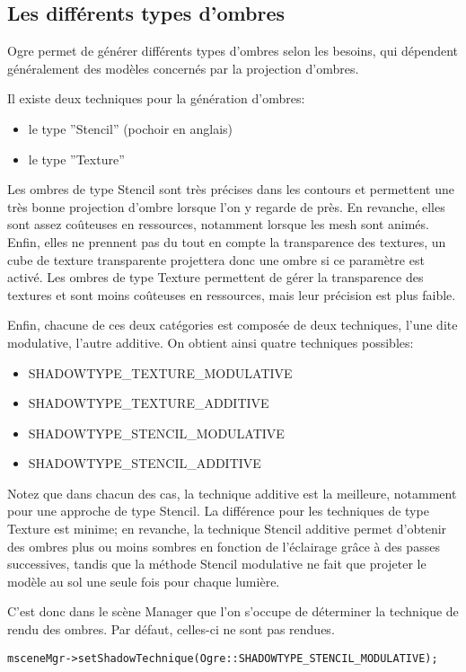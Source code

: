 \subsection{Les diff\'erents types d'ombres}

Ogre permet de g\'en\'erer diff\'erents types d'ombres selon les besoins, qui d\'ependent g\'en\'eralement des mod\`eles concern\'es par la projection d'ombres.

Il existe deux techniques pour la g\'en\'eration d'ombres:
\begin{itemize}
\item le type ''Stencil'' (pochoir en anglais)
\item le type ''Texture''
\end{itemize}

Les ombres de type Stencil sont tr\`es pr\'ecises dans les contours et permettent une tr\`es bonne projection d'ombre lorsque l'on y regarde de pr\`es. En revanche, elles sont assez co\^uteuses en ressources, notamment lorsque les mesh sont anim\'es. Enfin, elles ne prennent pas du tout en compte la transparence des textures, un cube de texture transparente projettera donc une ombre si ce param\`etre est activ\'e.
Les ombres de type Texture permettent de g\'erer la transparence des textures et sont moins co\^uteuses en ressources, mais leur pr\'ecision est plus faible.

Enfin, chacune de ces deux cat\'egories est compos\'ee de deux techniques, l'une dite modulative, l'autre additive. On obtient ainsi quatre techniques possibles:
\begin{itemize}
\item SHADOWTYPE\_TEXTURE\_MODULATIVE
\item SHADOWTYPE\_TEXTURE\_ADDITIVE
\item SHADOWTYPE\_STENCIL\_MODULATIVE
\item SHADOWTYPE\_STENCIL\_ADDITIVE
\end{itemize}


Notez que dans chacun des cas, la technique additive est la meilleure, notamment pour une approche de type Stencil. La diff\'erence pour les techniques de type Texture est minime; en revanche, la technique Stencil additive permet d'obtenir des ombres plus ou moins sombres en fonction de l'\'eclairage gr\^{a}ce \`{a} des passes successives, tandis que la m\'ethode Stencil modulative ne fait que projeter le mod\`ele au sol une seule fois pour chaque lumi\`ere.

C'est donc dans le sc\`ene Manager que l'on s'occupe de d\'eterminer la technique de rendu des ombres. Par d\'efaut, celles-ci ne sont pas rendues.
\begin{lstlisting}
msceneMgr->setShadowTechnique(Ogre::SHADOWTYPE_STENCIL_MODULATIVE);
\end{lstlisting}


